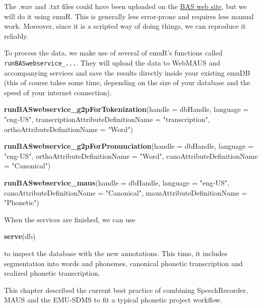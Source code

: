 \documentclass[]{book}
\newenvironment{Shaded}{\begin{snugshade}}{\end{snugshade}}
\newcommand{\KeywordTok}[1]{\textcolor[rgb]{0.13,0.29,0.53}{\textbf{{#1}}}}
\newcommand{\DataTypeTok}[1]{\textcolor[rgb]{0.13,0.29,0.53}{{#1}}}
\newcommand{\StringTok}[1]{\textcolor[rgb]{0.31,0.60,0.02}{{#1}}}
\newcommand{\NormalTok}[1]{{#1}}
\theoremstyle{definition}
\theoremstyle{definition}
\theoremstyle{definition}
\theoremstyle{remark}
\begin{document}
The .wav and .txt files could have been uploaded on the
\href{https://clarin.phonetik.uni-muenchen.de/BASWebServices/\#!/services/Pipeline}{BAS
web site}, but we will do it using emuR. This is generally less
error-prone and requires less manual work. Moreover, since it is a
scripted way of doing things, we can reproduce it reliably.

To process the data, we make use of several of emuR's functions called
\texttt{runBASwebservice\_...}. They will upload the data to WebMAUS and
accompanying services and save the results directly inside your existing
emuDB (this of course takes some time, depending on the size of your
database and the speed of your internet connection).

\begin{Shaded}
\begin{Highlighting}[]
\KeywordTok{runBASwebservice_g2pForTokenization}\NormalTok{(}\DataTypeTok{handle =} \NormalTok{dbHandle,}
                                    \DataTypeTok{language =} \StringTok{"eng-US"}\NormalTok{,}
                                    \DataTypeTok{transcriptionAttributeDefinitionName =} \StringTok{"transcription"}\NormalTok{,}
                                    \DataTypeTok{orthoAttributeDefinitionName =} \StringTok{"Word"}\NormalTok{)}

\KeywordTok{runBASwebservice_g2pForPronunciation}\NormalTok{(}\DataTypeTok{handle =} \NormalTok{dbHandle,}
                                     \DataTypeTok{language =} \StringTok{"eng-US"}\NormalTok{,}
                                     \DataTypeTok{orthoAttributeDefinitionName =} \StringTok{"Word"}\NormalTok{,}
                                     \DataTypeTok{canoAttributeDefinitionName =} \StringTok{"Canonical"}\NormalTok{)}

\KeywordTok{runBASwebservice_maus}\NormalTok{(}\DataTypeTok{handle =} \NormalTok{dbHandle,}
                      \DataTypeTok{language =} \StringTok{"eng-US"}\NormalTok{,}
                      \DataTypeTok{canoAttributeDefinitionName =} \StringTok{"Canonical"}\NormalTok{,}
                      \DataTypeTok{mausAttributeDefinitionName =} \StringTok{"Phonetic"}\NormalTok{)}
\end{Highlighting}
\end{Shaded}

When the services are finished, we can use

\begin{Shaded}
\begin{Highlighting}[]
\KeywordTok{serve}\NormalTok{(db)}
\end{Highlighting}
\end{Shaded}

to inspect the database with the new annotations. This time, it includes
segmentation into words and phonemes, canonical phonetic transcription
and realized phonetic transcription.

This chapter described the current best practice of combining
SpeechRecorder, MAUS and the EMU-SDMS to fit a typical phonetic project
workflow.


\end{document}
